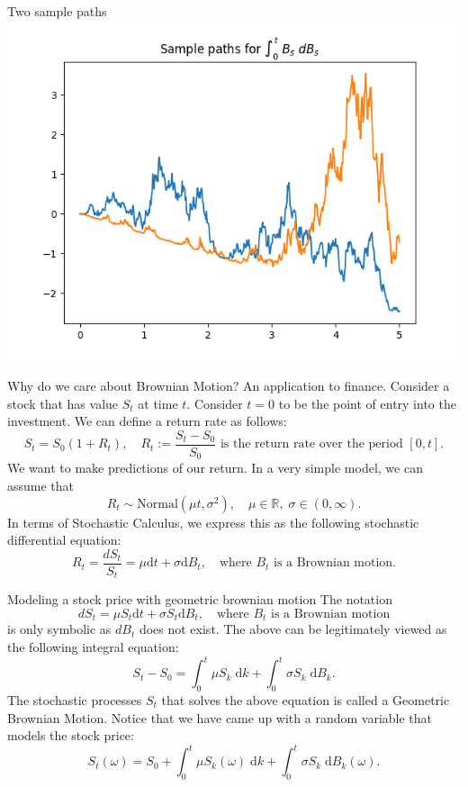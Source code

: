\documentclass{beamer}%
\numberwithin{equation}{section}
\newcommand{\R}{\mathbb{R}}
\newcommand{\ud}{\ensuremath{\mathrm{d} }}
\begin{document}
\begin{frame}{Two sample paths}
	\includegraphics[scale=.7]{StochIntegralExample}
\end{frame}

\begin{frame}{Why do we care about Brownian Motion? An application to finance.}
	Consider a stock that has value $S_t$ at time $t$. Consider $t=0$ to be the point of entry into the investment. We can define a return rate as follows:
		\[
			S_t = S_0(1 + R_t ), \quad R_t := \frac{S_t - S_0}{S_0} \text{ is the return rate over the period $[0,t]$} .
		\]
	We want to make predictions of our return. In a very simple model, we can assume that 
		\[
			R_t \sim \text{Normal}(\mu t, \sigma^2), \quad \mu \in \R,\; \sigma \in (0,\infty).
		\]
	In terms of Stochastic Calculus, we express this as the following stochastic differential equation:
		\[
		R_t =	\frac{dS_t}{S_t} = \mu \ud t + \sigma \ud B_t, \quad \text{where } B_t \text{ is a Brownian motion.}
		\]
	
\end{frame}

\begin{frame}{Modeling a stock price with geometric brownian motion}
The notation 
	\[
		dS_t = \mu S_t \ud t + \sigma S_t \ud B_t, \quad \text{where } B_t \text{ is a Brownian motion}
	\]
is only symbolic as $dB_t$ does not exist. The above can be legitimately viewed as the following integral equation:
	\[
		S_t - S_0 = \int_0^t \mu S_k \; \ud k + \int_0^t \sigma S_k \; \ud B_k.
	\] 		
The stochastic processes $S_t$ that solves the above equation is called a Geometric Brownian Motion. 	Notice that we have came up with a random variable that models the stock price:
	\[
		S_t(\omega)  = S_0 +  \int_0^t \mu S_k(\omega) \; \ud k + \int_0^t \sigma S_k \; \ud B_k(\omega).
	\]
\end{frame}
\end{document}
